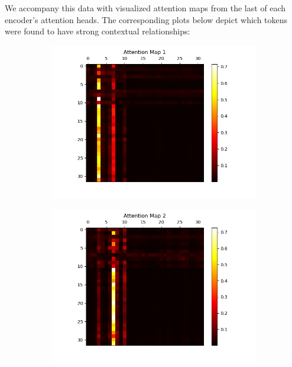 \documentclass[10pt]{article}
\theoremstyle{definition}
\begin{document}
\noindent We accompany this data with visualized attention maps from the last of each encoder's attention heads. The corresponding plots below depict which tokens were found to have strong contextual relationships:
\begin{figure}[H]
    \centering
    \begin{subfigure}[b]{0.35\textwidth}
        \centering
        \includegraphics[scale=0.4]{../data/plots/part3/attention_map_1.png}
        \label{subfig:am1}
    \end{subfigure}
    \begin{subfigure}[b]{0.35\textwidth}
        \centering
        \includegraphics[scale=0.4]{../data/plots/part3/attention_map_2.png}
        \label{subfig:am2}

\end{subfigure}
\end{figure}
\end{document}
